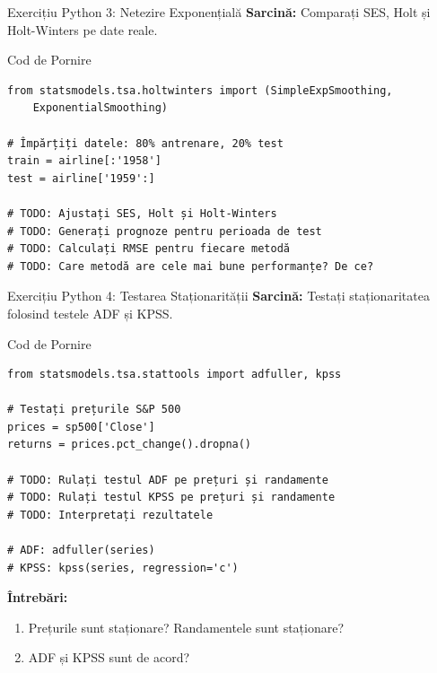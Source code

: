 \documentclass[9pt, aspectratio=169, t]{beamer}
\begin{document}
\begin{frame}[fragile]{Exercițiu Python 3: Netezire Exponențială}
    \textbf{Sarcină:} Comparați SES, Holt și Holt-Winters pe date reale.

    \vspace{0.3cm}

    \begin{block}{Cod de Pornire}
    \small
    \begin{verbatim}
from statsmodels.tsa.holtwinters import (SimpleExpSmoothing,
    ExponentialSmoothing)

# Împărțiți datele: 80% antrenare, 20% test
train = airline[:'1958']
test = airline['1959':]

# TODO: Ajustați SES, Holt și Holt-Winters
# TODO: Generați prognoze pentru perioada de test
# TODO: Calculați RMSE pentru fiecare metodă
# TODO: Care metodă are cele mai bune performanțe? De ce?
    \end{verbatim}
    \end{block}
\end{frame}

\begin{frame}[fragile]{Exercițiu Python 4: Testarea Staționarității}
    \textbf{Sarcină:} Testați staționaritatea folosind testele ADF și KPSS.

    \vspace{0.3cm}

    \begin{block}{Cod de Pornire}
    \small
    \begin{verbatim}
from statsmodels.tsa.stattools import adfuller, kpss

# Testați prețurile S&P 500
prices = sp500['Close']
returns = prices.pct_change().dropna()

# TODO: Rulați testul ADF pe prețuri și randamente
# TODO: Rulați testul KPSS pe prețuri și randamente
# TODO: Interpretați rezultatele

# ADF: adfuller(series)
# KPSS: kpss(series, regression='c')
    \end{verbatim}
    \end{block}

    \textbf{Întrebări:}
    \begin{enumerate}
        \item Prețurile sunt staționare? Randamentele sunt staționare?
        \item ADF și KPSS sunt de acord?
    \end{enumerate}
\end{frame}
\end{document}
